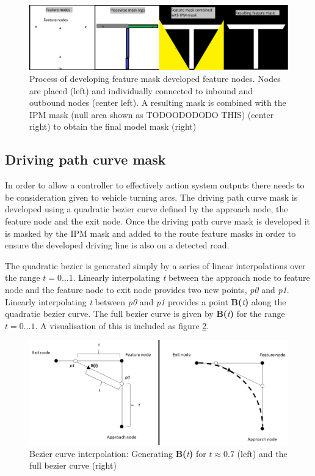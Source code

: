 \documentclass[]{aiaa-tc}%
\begin{document}
\begin{figure}
	\centering
	\includegraphics[width=1\textwidth]{FeatureMatching/featureMaskDevelopment.png}
	\caption{Process of developing feature mask developed feature nodes. Nodes are placed (left) and individually connected to inbound and outbound nodes (center left). A resulting mask is combined with the IPM mask (null area shown as TODOODODODO THIS) (center right) to obtain the final model mask (right)}
	\label{f:featureMaskDevelopment}
\end{figure}


\subsection{Driving path curve mask} \label{s:drivingPathMatching}

In order to allow a controller to effectively action system outputs there needs to be consideration given to vehicle turning arcs. The driving path curve mask is developed using a quadratic bezier curve defined by the approach node, the feature node and the exit node. Once the driving path curve mask is developed it is masked by the IPM mask and added to the route feature masks in order to ensure the developed driving line is also on a detected road. 

The quadratic bezier is generated simply by a series of linear interpolations over the range $t=0...1$. Linearly interpolating \textit{t} between the approach node to feature node and the feature node to exit node provides two new points, \textit{p0} and \textit{p1}. Linearly interpolating \textit{t} between \textit{p0} and \textit{p1} provides a point \textbf{B(}\textit{t}\textbf{)} along the quadratic bezier curve. The full bezier curve is given by \textbf{B(}\textit{t}\textbf{)} for the range $t=0...1$. A visualisation of this is included as figure \ref{f:quadraticBezier}.

\begin{figure}
	\centering
	\includegraphics[width=1\textwidth]{bezier/quadraticBezier.png}
	\caption{Bezier curve interpolation: Generating \textbf{B(}\textit{t}\textbf{)} for $t\approx0.7$ (left) and the full bezier curve (right)}
	\label{f:quadraticBezier}
\end{figure}
\end{document}
